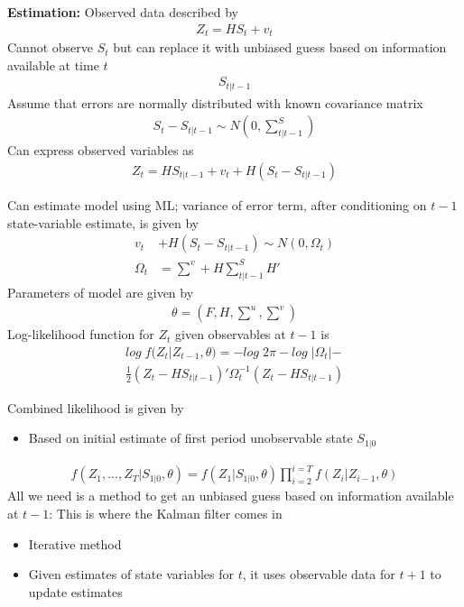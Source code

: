 \documentclass{beamer}
\begin{document}
\begin{frame}
  \textbf{Estimation:} Observed data described by
  \begin{align}
    Z_t = HS_t + v_t
  \end{align}
  Cannot observe $S_t$ but can replace it with unbiased guess based on information available at time $t$
  \begin{align}
    S_{t|t-1}
  \end{align}
  Assume that errors are normally distributed with known covariance matrix
  \begin{align}
    S_t-S_{t|t-1} \sim N (0,\scriptstyle \sum^S_{t|t-1})
  \end{align}
  Can express observed variables as
  \begin{align}
    Z_t=HS_{t|t-1}+v_t +H(S_t-S_{t|t-1})
  \end{align}
\end{frame}



\begin{frame}
  Can estimate model using ML; variance of error term, after conditioning on $t-1$ state-variable estimate, is given by
  \begin{align}
    v_t &+ H(S_t-S_{t|t-1}) \sim N (0,\Omega_t)\\
    \Omega_t &=\scriptstyle\sum^v +H\sum^S_{t|t-1}H'
  \end{align}
  Parameters of model are given by 
  \begin{align}
    \theta=(F,H,\scriptstyle \sum^u,\sum^v)
  \end{align}
  Log-likelihood function for $Z_t$ given observables at $t-1$ is
  \begin{align}
    log\;f(Z_t|Z_{t-1},\theta)= -log\; 2\pi -log\;|\Omega_t|-\\ \nonumber \frac{1}{2}(Z_t-HS_{t|t-1})'\Omega_t^{-1}(Z_t-HS_{t|t-1})
  \end{align}  
\end{frame}

\begin{frame}
  Combined likelihood is given by
  \begin{itemize}
    \item Based on initial estimate of first period unobservable state $S_{1|0}$
  \end{itemize}
  \begin{align}
    f(Z_1,...,Z_T|S_{1|0},\theta)=f(Z_1|S_{1|0},\theta)\prod_{i=2}^{i=T}f(Z_i|Z_{i-1},\theta)
  \end{align}
  All we need is a method to get an unbiased guess based on information available at $t-1$: This is where the Kalman filter comes in
  \begin{itemize}
    \item Iterative method
    \item Given estimates of state variables for $t$, it uses observable data for $t+1$ to update estimates
  \end{itemize}
\end{frame}
\end{document}
